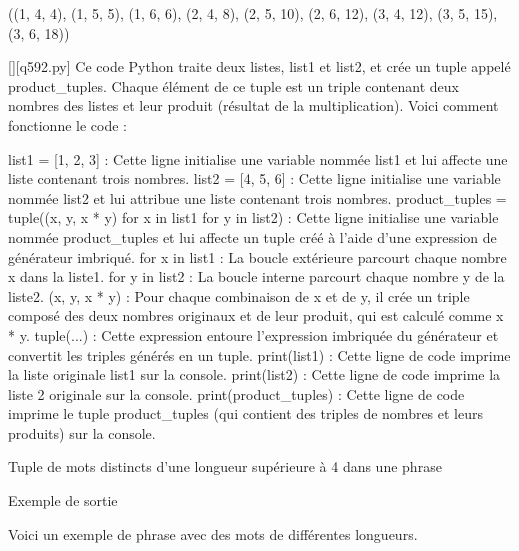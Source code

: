 ((1, 4, 4), (1, 5, 5), (1, 6, 6), (2, 4, 8), (2, 5, 10), (2, 6, 12), (3, 4, 12), (3, 5, 15), (3, 6, 18))
        \par
        \begin{solution}
            \renewcommand{\nomfichier}{q592.py}
            \pythonfile{\chemincode \nomfichier}[][\nomfichier]
            Ce code Python traite deux listes, list1 et list2, et crée un tuple appelé product\_tuples. Chaque élément de ce tuple est un triple contenant deux nombres des listes et leur produit (résultat de la multiplication). Voici comment fonctionne le code :

    list1 = [1, 2, 3] : Cette ligne initialise une variable nommée list1 et lui affecte une liste contenant trois nombres.
    list2 = [4, 5, 6] : Cette ligne initialise une variable nommée list2 et lui attribue une liste contenant trois nombres.
    product\_tuples = tuple((x, y, x * y) for x in list1 for y in list2) : Cette ligne initialise une variable nommée product\_tuples et lui affecte un tuple créé à l'aide d'une expression de générateur imbriqué.
        for x in list1 : La boucle extérieure parcourt chaque nombre x dans la liste1.
        for y in list2 : La boucle interne parcourt chaque nombre y de la liste2.
        (x, y, x * y) : Pour chaque combinaison de x et de y, il crée un triple composé des deux nombres originaux et de leur produit, qui est calculé comme x * y.
        tuple(...) : Cette expression entoure l'expression imbriquée du générateur et convertit les triples générés en un tuple.
    print(list1) : Cette ligne de code imprime la liste originale list1 sur la console.
    print(list2) : Cette ligne de code imprime la liste 2 originale sur la console.
    print(product\_tuples) : Cette ligne de code imprime le tuple product\_tuples (qui contient des triples de nombres et leurs produits) sur la console.
        \end{solution}
        

        \question
        Tuple de mots distincts d'une longueur supérieure à 4 dans une phrase

Exemple de sortie

Voici un exemple de phrase avec des mots de différentes longueurs.

